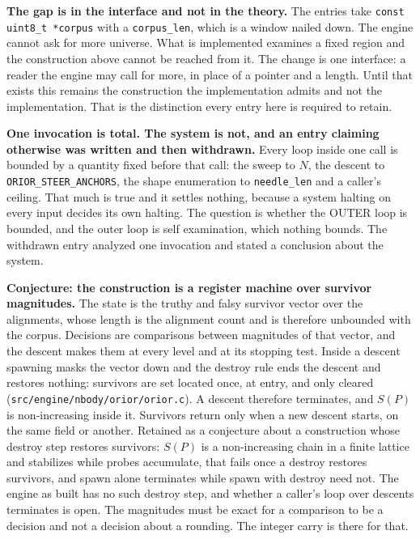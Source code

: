 \textbf{The gap is in the interface and not in the theory.} The entries take \texttt{const uint8\_t *corpus} with a \texttt{corpus\_len}, which is a window nailed down. The engine cannot ask for more universe. What is implemented examines a fixed region and the construction above cannot be reached from it. The change is one interface: a reader the engine may call for more, in place of a pointer and a length. Until that exists this remains the construction the implementation admits and not the implementation. That is the distinction every entry here is required to retain.

\textbf{One invocation is total. The system is not, and an entry claiming otherwise was written and then withdrawn.} Every loop inside one call is bounded by a quantity fixed before that call: the sweep to \(N\), the descent to \texttt{ORIOR\_STEER\_ANCHORS}, the shape enumeration to \texttt{needle\_len} and a caller's ceiling. That much is true and it settles nothing, because a system halting on every input decides its own halting. The question is whether the OUTER loop is bounded, and the outer loop is self examination, which nothing bounds. The withdrawn entry analyzed one invocation and stated a conclusion about the system.

\textbf{Conjecture: the construction is a register machine over survivor magnitudes.} The state is the truthy and falsy survivor vector over the alignments, whose length is the alignment count and is therefore unbounded with the corpus. Decisions are comparisons between magnitudes of that vector, and the descent makes them at every level and at its stopping test. Inside a descent spawning masks the vector down and the destroy rule ends the descent and restores nothing: survivors are set located once, at entry, and only cleared (\texttt{src/\allowbreak{}engine/\allowbreak{}nbody/\allowbreak{}orior/\allowbreak{}orior.c}). A descent therefore terminates, and \(S(P)\) is non-increasing inside it. Survivors return only when a new descent starts, on the same field or another. Retained as a conjecture about a construction whose destroy step restores survivors: \(S(P)\) is a non-increasing chain in a finite lattice and stabilizes while probes accumulate, that fails once a destroy restores survivors, and spawn alone terminates while spawn with destroy need not. The engine as built has no such destroy step, and whether a caller's loop over descents terminates is open. The magnitudes must be exact for a comparison to be a decision and not a decision about a rounding. The integer carry is there for that.

